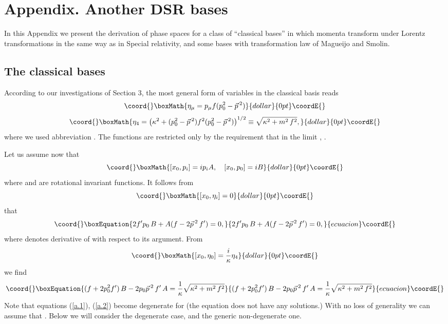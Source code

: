 \documentclass  [12pt] {article}
\def\vp{\vec{p}\, {}^2}
\begin{document}
\section*{Appendix. Another DSR bases}

In this Appendix we present the derivation of phase spaces for a class of
``classical bases'' in which momenta transform under Lorentz transformations in
the same way as in Special relativity, and some bases with transformation law
of Magueijo and Smolin.

\subsection*{The classical bases}

According to our investigations of Section 3, the most general form of \myHighlight{$\eta$}\coordHE{}
variables in the classical basis reads
$$\coord{}\boxMath{
 \eta_{\mu}=p_{\mu}f(p_{0}^{2}-\vp)
}{dollar}{0pt}\coordE{}$$  $$\coord{}\boxMath{
 \eta_{4}= \left(\kappa^{2}+(p_{0}^{2}-\vp)f^2(p_{0}^{2}-\vp)\right)^{1/2} \equiv \sqrt{\kappa^{2}+ m^2\, f^2},
}{dollar}{0pt}\coordE{}$$
where we used abbreviation \myHighlight{$m^2 \equiv p_{0}^{2}-\vp$}\coordHE{}. The
functions \coordHE{} are restricted only by the requirement that in the
limit \myHighlight{$\kappa\rightarrow\infty$}\coordHE{}, \coordHE{}.

Let us assume now that
$$\coord{}\boxMath{
 [x_{0},p_{i}]=ip_{i}A,\quad [x_{0},p_{0}]= iB
}{dollar}{0pt}\coordE{}$$
where \coordHE{} and \coordHE{} are rotational invariant functions. It follows from
$$\coord{}\boxMath{
 [x_{0},\eta_{i}]=0
}{dollar}{0pt}\coordE{}$$
that
\begin{equation}\coord{}\boxEquation{\label{a.1}
  2f'p_0\, B +  A(f -2\vp\, f') =0,
}{2f'p_0\, B +  A(f -2\vp\, f') =0,
}{ecuacion}\coordE{}\end{equation}
where \coordHE{} denotes derivative of \coordHE{} with respect to its argument.
 From
$$\coord{}\boxMath{
 [x_{0},\eta_{0}]=\frac{i}{\kappa}\eta_{4}
}{dollar}{0pt}\coordE{}$$
we find
\begin{equation}\coord{}\boxEquation{\label{a.2}
(f+2p^2_{0}f')\,B
 -2p_{0}\vp\,f'\,A
 =  \frac{1}{\kappa}\sqrt{\kappa^{2}+ m^2\, f^2}
}{(f+2p^2_{0}f')\,B
 -2p_{0}\vp\,f'\,A
 =  \frac{1}{\kappa}\sqrt{\kappa^{2}+ m^2\, f^2}
}{ecuacion}\coordE{}\end{equation}
Note that equations (\ref{a.1}), (\ref{a.2}) become degenerate for
\coordHE{} (the equation \myHighlight{$f -2\vp\, f' =0$}\coordHE{} does not have any
solutions.)  With no loss of generality we can assume that  \coordHE{}. Below we will consider the degenerate case, and the generic
non-degenerate one.
\newline
\end{document}
